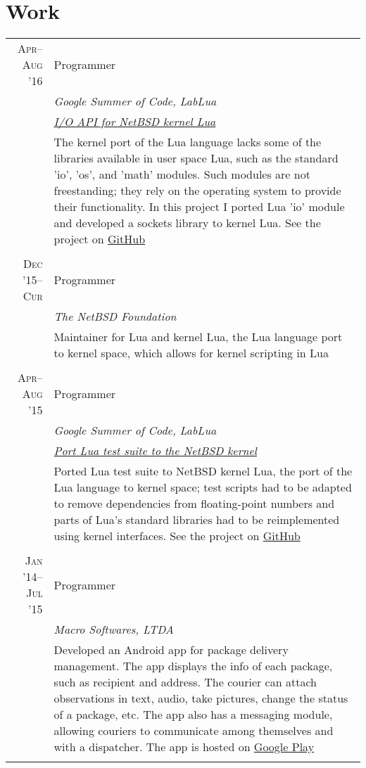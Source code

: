 \documentclass[a4paper,10pt]{article}
\begin{document}
\section{Work}

\begin{longtable}{r|p{11cm}}

  \textsc{Apr--Aug '16} & Programmer \\
  &\emph{Google Summer of Code, LabLua}\\
  &\emph{\footnotesize{\href{https://goo.gl/g8Mb2M}{I/O API for NetBSD kernel Lua}}}\\
  &\footnotesize{The kernel port of the Lua language lacks some of the libraries
  available in user space Lua, such as the standard 'io', 'os', and 'math' modules. 
  Such modules are not freestanding; they rely on the operating system to provide
  their functionality. In this project I ported Lua 'io' module and developed a 
  sockets library to kernel Lua. See the project on 
  \href{https://GitHub.com/salazar/luaio}{GitHub}}
  \\\multicolumn{2}{c}{} \\

  \textsc{Dec '15--Cur}
  & Programmer \\
  &\emph{The NetBSD Foundation}\\
  &\footnotesize{Maintainer for Lua and kernel Lua, the Lua language
  port to kernel space, which allows for kernel scripting in Lua}
  \\\multicolumn{2}{c}{} \\
  
  \textsc{Apr--Aug '15}
  & Programmer \\
  &\emph{Google Summer of Code, LabLua}\\
  &\emph{\footnotesize{\href{https://goo.gl/xSl1bW}{Port Lua test
         suite to the NetBSD kernel}}}\\
  &\footnotesize{Ported Lua test suite to NetBSD kernel Lua, the port of the Lua
  language to kernel space; test scripts
   had to be adapted to remove dependencies from floating-point numbers and parts
   of Lua's standard libraries had to be reimplemented using kernel interfaces.
   See the project on 
   \href{https://GitHub.com/salazar/luatests}{GitHub}}
  \\\multicolumn{2}{c}{} \\

  \textsc{Jan '14--Jul '15}
  & Programmer \\
  &\emph{Macro Softwares, LTDA}\\
  &\footnotesize{Developed an Android app for package delivery management. The
  app displays the info of each package, such as recipient and address.
  The courier can attach observations in text, audio, take pictures,
  change the status of a package, etc. The app also has a messaging module,
  allowing couriers to communicate among themselves and with a dispatcher. The app
  is hosted on 
  \href{https://play.google.com/store/apps/details?id=br.com.entregadoronline}{Google Play}} \\
  \multicolumn{2}{c}{} \\


\end{longtable}
\end{document}
